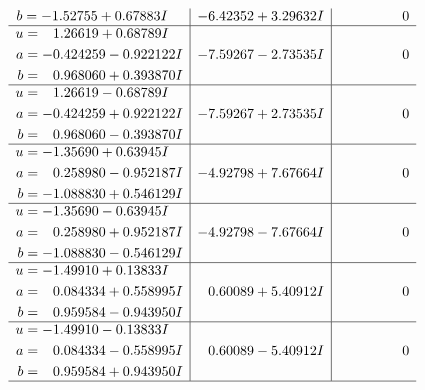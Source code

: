 \documentclass[1p]{elsarticle_modified}
\theoremstyle{definition}
\begin{document}
$$\begin{array}{c|c|c}
\begin{aligned}
b &= -1.52755 + 0.67883 I\end{aligned}
 & -6.42352 + 3.29632 I & \phantom{-0.000000 } 0 \\ \hline\begin{aligned}
u &= \phantom{-}1.26619 + 0.68789 I \\
a &= -0.424259 - 0.922122 I \\
b &= \phantom{-}0.968060 + 0.393870 I\end{aligned}
 & -7.59267 - 2.73535 I & \phantom{-0.000000 } 0 \\ \hline\begin{aligned}
u &= \phantom{-}1.26619 - 0.68789 I \\
a &= -0.424259 + 0.922122 I \\
b &= \phantom{-}0.968060 - 0.393870 I\end{aligned}
 & -7.59267 + 2.73535 I & \phantom{-0.000000 } 0 \\ \hline\begin{aligned}
u &= -1.35690 + 0.63945 I \\
a &= \phantom{-}0.258980 - 0.952187 I \\
b &= -1.088830 + 0.546129 I\end{aligned}
 & -4.92798 + 7.67664 I & \phantom{-0.000000 } 0 \\ \hline\begin{aligned}
u &= -1.35690 - 0.63945 I \\
a &= \phantom{-}0.258980 + 0.952187 I \\
b &= -1.088830 - 0.546129 I\end{aligned}
 & -4.92798 - 7.67664 I & \phantom{-0.000000 } 0 \\ \hline\begin{aligned}
u &= -1.49910 + 0.13833 I \\
a &= \phantom{-}0.084334 + 0.558995 I \\
b &= \phantom{-}0.959584 - 0.943950 I\end{aligned}
 & \phantom{-}0.60089 + 5.40912 I & \phantom{-0.000000 } 0 \\ \hline\begin{aligned}
u &= -1.49910 - 0.13833 I \\
a &= \phantom{-}0.084334 - 0.558995 I \\
b &= \phantom{-}0.959584 + 0.943950 I\end{aligned}
 & \phantom{-}0.60089 - 5.40912 I & \phantom{-0.000000 } 0\\
 \hline 
 \end{array}$$\newpage$$\begin{array}{c|c|c}  

\end{array}$$
\end{document}
